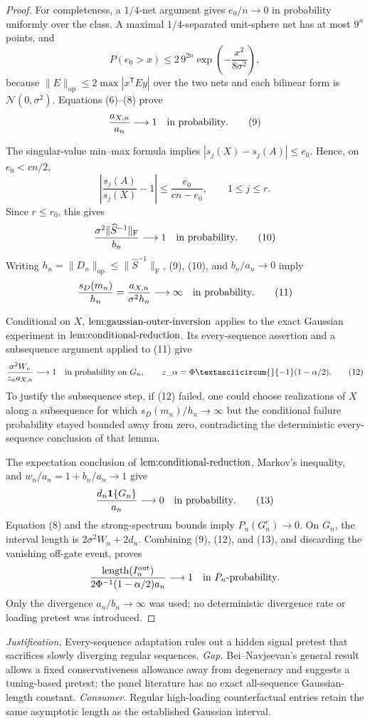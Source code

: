 \documentclass{article}
\begin{document}
\begin{proof}
For completeness, a \(1/4\)-net argument gives \(e_0/n\to0\) in probability uniformly over the class.  A maximal \(1/4\)-separated unit-sphere net has at most \(9^n\) points, and
\[
P(e_0>x)\le2\,9^{2n}\exp\left(-\frac{x^2}{8\sigma^2}\right),
\tag{8}
\]
because \(\|E\|_{\mathrm{op}}\le2\max|x^{\mathsf T}Ey|\) over the two nets and each bilinear form is \(\mathcal N(0,\sigma^2)\).  Equations (6)--(8) prove
\[
\frac{a_{X,n}}{a_n}\longrightarrow1
\quad\hbox{in probability}.
\tag{9}
\]

The singular-value min--max formula implies \(|s_j(X)-s_j(A)|\le e_0\).  Hence, on \(e_0<cn/2\),
\[
\left|\frac{s_j(A)}{s_j(X)}-1\right|
\le\frac{e_0}{cn-e_0},
\qquad 1\le j\le r.
\]
Since \(r\le r_0\), this gives
\[
\frac{\sigma^2\|\widehat S^{-1}\|_{\mathrm F}}{b_n}
\longrightarrow1
\quad\hbox{in probability}.
\tag{10}
\]
Writing \(h_n=\|D_n\|_{\mathrm{op}}\le\|\widehat S^{-1}\|_{\mathrm F}\), (9), (10), and \(b_n/a_n\to0\) imply
\[
\frac{s_D(m_n)}{h_n}
=\frac{a_{X,n}}{\sigma^2h_n}\longrightarrow\infty
\quad\hbox{in probability}.
\tag{11}
\]

Conditional on \(X\), \(\textup{lem:gaussian-outer-inversion}\) applies to the exact Gaussian experiment in \(\textup{lem:conditional-reduction}\).  Its every-sequence assertion and a subsequence argument applied to (11) give
\[
\frac{\sigma^2W_n}{z_\alpha a_{X,n}}\longrightarrow1
\quad\hbox{in probability on \(G_n\)},
\qquad z\_\alpha=\Phi\textasciicircum{}{-1}(1-\alpha/2).
\tag{12}
\]
To justify the subsequence step, if (12) failed, one could choose realizations of \(X\) along a subsequence for which \(s_D(m_n)/h_n\to\infty\) but the conditional failure probability stayed bounded away from zero, contradicting the deterministic every-sequence conclusion of that lemma.

The expectation conclusion of \(\textup{lem:conditional-reduction}\), Markov's inequality, and \(w_n/a_n=1+b_n/a_n\to1\) give
\[
\frac{d_n\mathbf1\{G_n\}}{a_n}\longrightarrow0
\quad\hbox{in probability}.
\tag{13}
\]
Equation (8) and the strong-spectrum bounds imply \(P_n(G_n^c)\to0\).  On \(G_n\), the interval length is \(2\sigma^2W_n+2d_n\).  Combining (9), (12), and (13), and discarding the vanishing off-gate event, proves
\[
\frac{\operatorname{length}(I_n^{\mathrm{out}})}
{2\Phi^{-1}(1-\alpha/2)a_n}\longrightarrow1
\quad\hbox{in \(P_n\)-probability}.
\]
Only the divergence \(a_n/b_n\to\infty\) was used; no deterministic divergence rate or loading pretest was introduced.
\end{proof}
\par\smallskip\noindent \textit{Justification.} Every-sequence adaptation rules out a hidden signal pretest that sacrifices slowly diverging regular sequences. \textit{Gap.} Bei--Navjeevan's general result allows a fixed conservativeness allowance away from degeneracy and suggests a tuning-based pretest; the panel literature has no exact all-sequence Gaussian-length constant. \textit{Consumer.} Regular high-loading counterfactual entries retain the same asymptotic length as the established Gaussian interval.
\end{document}
